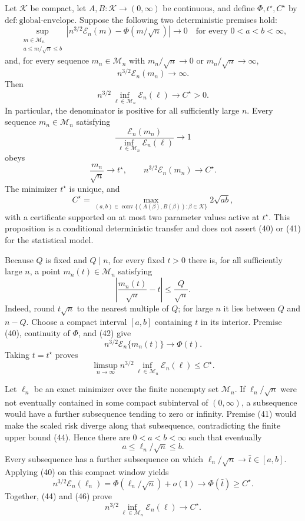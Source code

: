 Let \(\mathcal K\) be compact, let \(A,B:\mathcal K\to(0,\infty)\) be continuous, and define \(\Phi,t^\star,C^\star\) by \(\mathrm{def{:}global\text{-}envelope}\).  Suppose the following two deterministic premises hold:
\[
\sup_{\substack{m\in\mathcal M_n\\ a\leq m/\sqrt n\leq b}}
\left|n^{3/2}\mathcal E_n(m)-\Phi(m/\sqrt n)\right|
\longrightarrow0
\quad\text{for every }0<a<b<\infty,
\tag{40}
\]
and, for every sequence \(m_n\in\mathcal M_n\) with
\(m_n/\sqrt n\to0\) or \(m_n/\sqrt n\to\infty\),
\[
n^{3/2}\mathcal E_n(m_n)\longrightarrow\infty.
\tag{41}
\]
Then
\[
n^{3/2}\inf_{\ell\in\mathcal M_n}\mathcal E_n(\ell)\longrightarrow C^\star>0.
\]
In particular, the denominator is positive for all sufficiently large \(n\).  Every sequence \(m_n\in\mathcal M_n\) satisfying
\[
\frac{\mathcal E_n(m_n)}
{\inf_{\ell\in\mathcal M_n}\mathcal E_n(\ell)}
\longrightarrow1
\]
obeys
\[
\frac{m_n}{\sqrt n}\longrightarrow t^\star,
\qquad
n^{3/2}\mathcal E_n(m_n)\longrightarrow C^\star.
\]
The minimizer \(t^\star\) is unique, and
\[
C^\star
=\max_{(a,b)\in\operatorname{conv}
\{(A(\beta),B(\beta)):\beta\in\mathcal K\}}
2\sqrt{ab},
\]
with a certificate supported on at most two parameter values active at \(t^\star\).  This proposition is a conditional deterministic transfer and does not assert (40) or (41) for the statistical model.

Because \(Q\) is fixed and \(Q\mid n\), for every fixed \(t>0\) there is, for all sufficiently large \(n\), a point \(m_n(t)\in\mathcal M_n\) satisfying
\[
\left|\frac{m_n(t)}{\sqrt n}-t\right|
\leq\frac Q{\sqrt n}.
\tag{42}
\]
Indeed, round \(t\sqrt n\) to the nearest multiple of \(Q\); for large \(n\) it lies between \(Q\) and \(n-Q\).  Choose a compact interval \([a,b]\) containing \(t\) in its interior.  Premise (40), continuity of \(\Phi\), and (42) give
\[
n^{3/2}\mathcal E_n\{m_n(t)\}
\longrightarrow\Phi(t).
\tag{43}
\]
Taking \(t=t^\star\) proves
\[
\limsup_{n\to\infty}
n^{3/2}\inf_{\ell\in\mathcal M_n}\mathcal E_n(\ell)
\leq C^\star.
\tag{44}
\]

Let \(\ell_n\) be an exact minimizer over the finite nonempty set
\(\mathcal M_n\).  If \(\ell_n/\sqrt n\) were not eventually contained in some compact subinterval of \((0,\infty)\), a subsequence would have a further subsequence tending to zero or infinity.  Premise (41) would make the scaled risk diverge along that subsequence, contradicting the finite upper bound (44).  Hence there are \(0<a<b<\infty\) such that eventually
\[
a\leq\ell_n/\sqrt n\leq b.
\tag{45}
\]
Every subsequence has a further subsequence on which
\(\ell_n/\sqrt n\to\bar t\in[a,b]\).  Applying (40) on this compact window yields
\[
n^{3/2}\mathcal E_n(\ell_n)
=\Phi(\ell_n/\sqrt n)+o(1)
\longrightarrow\Phi(\bar t)\geq C^\star.
\tag{46}
\]
Together, (44) and (46) prove
\[
n^{3/2}\inf_{\ell\in\mathcal M_n}\mathcal E_n(\ell)
\longrightarrow C^\star.
\tag{47}
\]

